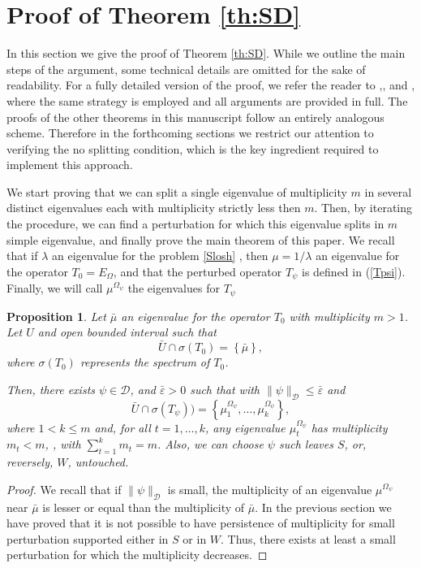 \documentclass[a4paper,reqno,11pt,oneside]{amsart}
\theoremstyle{plain}
\theoremstyle{plain}
\theoremstyle{plain}
\newtheorem{proposition}[thm]{Proposition}
\theoremstyle{remark}
\begin{document}
\section{Proof of Theorem \ref{th:SD}}\label{teorema1}
In this section we give the proof of Theorem \ref{th:SD}. While we outline the main steps of the argument, some technical details are omitted for the sake of readability.  For a fully detailed version of the proof, we refer the reader to \cite[Proof of Thm 1]{fgmp},\cite[Sec 5]{MiSNS}, and \cite[Lemma 7]{mi2}, where the same strategy is employed and all arguments are provided in full. The proofs of the other theorems in this manuscript follow an entirely analogous scheme. Therefore in the forthcoming sections  we restrict our attention to verifying the no splitting condition, which is the key ingredient required to implement this approach.
 
We start proving that we can split a single eigenvalue of multiplicity $m$ in several distinct  eigenvalues each with multiplicity strictly less then $m$. Then, by iterating the procedure, we can find a perturbation for which this eigenvalue splits in $m$ simple eigenvalue, and finally prove the main theorem of this paper.
We recall that if ${\lambda}$ an eigenvalue for the problem \eqref{Slosh} , then $\mu=1/\lambda$ an eigenvalue for the operator $T_0=E_\Omega$, and that the perturbed operator $T_\psi$ is defined in (\ref{Tpsi}). Finally, we will call $\mu^{\Omega_\psi}$ the eigenvalues for $T_\psi$ 

\begin{proposition}
\label{theorem:main-tool} Let $\bar \mu$ an eigenvalue for the operator $T_0$ with
multiplicity $m>1$. Let $U$ and open bounded interval such
that 
\[
\bar{U}\cap\sigma\left(T_0\right)=\left\{ \bar{\mu}\right\} ,
\]
where $\sigma(T_0)$  represents  the spectrum of $T_0$. 

Then, there exists $\psi\in \mathcal{D}$, and $\bar\varepsilon>0$  such that with $\|\psi\|_{\mathcal{D}}\le\bar\varepsilon$ and
\[
\bar{U}\cap\sigma(T_\psi))=\left\{ \mu_{1}^{{\Omega_\psi}},\dots,\mu_{k}^{{\Omega_\psi}}\right\} ,
\]
where $1<k\le m$ and, for all $t=1,\dots, k$, any eigenvalue $\mu_{t}^{{\Omega_\psi}}$ has multiplicity $m_t<m$, , with $\sum_{t=1}^{k}m_{t}=m$.
Also, we can choose $\psi$ such leaves $S$, or, reversely, $W$, untouched.
\end{proposition}
\begin{proof}
We recall that if $\|\psi\|_{\mathcal{D}}$ is small, the multiplicity of an eigenvalue $\mu^{\Omega_\psi}$ near $\bar{\mu}$ is lesser or equal than the multiplicity of $\bar{\mu}$.
In the previous section we have proved that it is not possible to have persistence of multiplicity for small perturbation supported either in $S$ or in $W$. Thus, there exists at least a small perturbation for which the multiplicity decreases.
\end{proof}
\end{document}
